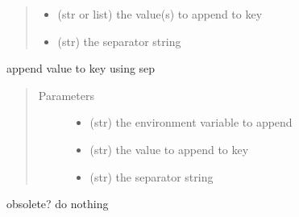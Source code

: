 \documentclass[a4paper,10pt,english]{sphinxmanual}
\begin{document}
\begin{fulllineitems}
\begin{fulllineitems}
\begin{quote}
\begin{description}
\begin{itemize}
\item {} 
 \textendash{} (str or list) the value(s) to append to key

\item {} 
 \textendash{} (str) the separator string

\end{itemize}

\end{description}\end{quote}

\end{fulllineitems}


\begin{fulllineitems}
\label{\detokenize{apidoc_src/src:src.fileEnviron.LauncherFileEnviron.append_value}}
append value to key using sep
\begin{quote}\begin{description}
\item[{Parameters}] \leavevmode\begin{itemize}
\item {} 
 \textendash{} (str) the environment variable to append

\item {} 
 \textendash{} (str) the value to append to key

\item {} 
 \textendash{} (str) the separator string

\end{itemize}

\end{description}\end{quote}

\end{fulllineitems}


\begin{fulllineitems}
\label{\detokenize{apidoc_src/src:src.fileEnviron.LauncherFileEnviron.change_to_launcher}}
obsolete? do nothing


\end{fulllineitems}
\end{fulllineitems}
\end{document}
